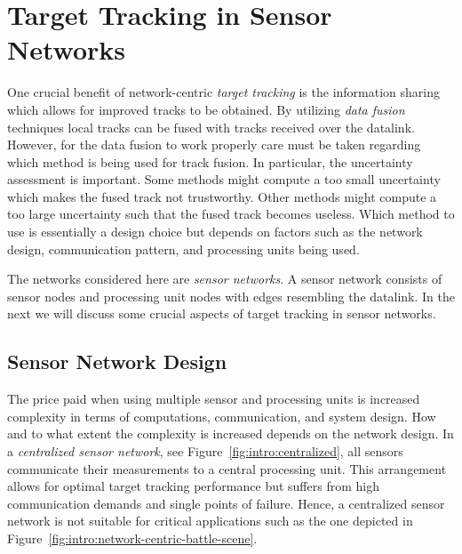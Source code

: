 \section{Target Tracking in Sensor Networks}

One crucial benefit of network-centric \emph{target tracking} is the information sharing which allows for improved tracks to be obtained. By utilizing \emph{data fusion} techniques local tracks can be fused with tracks received over the datalink. However, for the data fusion to work properly care must be taken regarding which method is being used for track fusion. In particular, the uncertainty assessment is important. Some methods might compute a too small uncertainty which makes the fused track not trustworthy. Other methods might compute a too large uncertainty such that the fused track becomes useless. Which method to use is essentially a design choice but depends on factors such as the network design, communication pattern, and processing units being used.

The networks considered here are \emph{sensor networks}. A sensor network consists of sensor nodes and processing unit nodes with edges resembling the datalink. In the next we will discuss some crucial aspects of target tracking in sensor networks.


\subsection{Sensor Network Design}

The price paid when using multiple sensor and processing units is increased complexity in terms of computations, communication, and system design. How and to what extent the complexity is increased depends on the network design. In a \emph{centralized sensor network}, see Figure~\ref{fig:intro:centralized}, all sensors communicate their measurements to a central processing unit. This arrangement allows for optimal target tracking performance but suffers from high communication demands and single points of failure. Hence, a centralized sensor network is not suitable for critical applications such as the one depicted in Figure~\ref{fig:intro:network-centric-battle-scene}.

